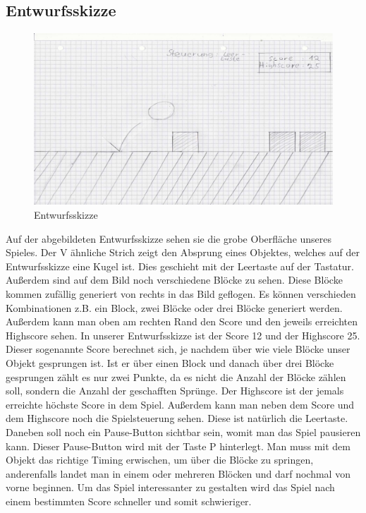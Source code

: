 \subsection{Entwurfsskizze}
\begin{figure}[htb]
	\centering
	\includegraphics[scale=0.22]{content/pictures/entwurfsskizze.png}
	\caption{Entwurfsskizze}
\end{figure}
\noindent
Auf der abgebildeten Entwurfsskizze sehen sie die grobe Oberfläche unseres Spieles. Der V ähnliche Strich zeigt den Absprung eines Objektes, welches auf der Entwurfsskizze eine Kugel ist. Dies geschieht mit der Leertaste auf der Tastatur. Außerdem sind auf dem Bild noch verschiedene Blöcke zu sehen. Diese Blöcke kommen zufällig generiert von rechts in das Bild geflogen. Es können verschieden Kombinationen z.B. ein Block, zwei Blöcke oder drei Blöcke generiert werden. Außerdem kann man oben am rechten Rand den Score und den jeweils erreichten Highscore sehen. In unserer Entwurfsskizze ist der Score 12 und der Highscore 25. Dieser sogenannte Score berechnet sich, je nachdem über wie viele Blöcke unser Objekt gesprungen ist. Ist er über einen Block und danach über drei Blöcke gesprungen zählt es nur zwei Punkte, da es nicht die Anzahl der Blöcke zählen soll, sondern die Anzahl der geschafften Sprünge. Der Highscore ist der jemals erreichte höchste Score in dem Spiel. Außerdem kann man neben dem Score und dem Highscore noch die Spielsteuerung sehen. Diese ist natürlich die Leertaste. Daneben soll noch ein Pause-Button sichtbar sein, womit man das Spiel pausieren kann. Dieser Pause-Button wird mit der Taste P hinterlegt. Man muss mit dem Objekt das richtige Timing erwischen, um über die Blöcke zu springen, anderenfalls landet man in einem oder mehreren Blöcken und darf nochmal von vorne beginnen. Um das Spiel interessanter zu gestalten wird das Spiel nach einem bestimmten Score schneller und somit schwieriger.
\newpage
